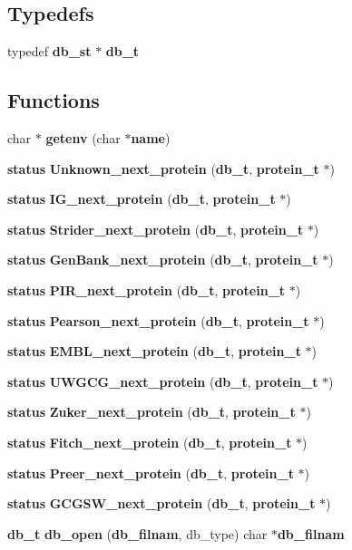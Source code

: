 \subsection*{Typedefs}
\begin{CompactItemize}
\item 
typedef {\bf db\_\-st} $\ast$ {\bf db\_\-t}
\end{CompactItemize}
\subsection*{Functions}
\begin{CompactItemize}
\item 
char $\ast$ {\bf getenv} (char $\ast${\bf name})
\item 
{\bf status} {\bf Unknown\_\-next\_\-protein} ({\bf db\_\-t}, {\bf protein\_\-t} $\ast$)
\item 
{\bf status} {\bf IG\_\-next\_\-protein} ({\bf db\_\-t}, {\bf protein\_\-t} $\ast$)
\item 
{\bf status} {\bf Strider\_\-next\_\-protein} ({\bf db\_\-t}, {\bf protein\_\-t} $\ast$)
\item 
{\bf status} {\bf Gen\-Bank\_\-next\_\-protein} ({\bf db\_\-t}, {\bf protein\_\-t} $\ast$)
\item 
{\bf status} {\bf PIR\_\-next\_\-protein} ({\bf db\_\-t}, {\bf protein\_\-t} $\ast$)
\item 
{\bf status} {\bf Pearson\_\-next\_\-protein} ({\bf db\_\-t}, {\bf protein\_\-t} $\ast$)
\item 
{\bf status} {\bf EMBL\_\-next\_\-protein} ({\bf db\_\-t}, {\bf protein\_\-t} $\ast$)
\item 
{\bf status} {\bf UWGCG\_\-next\_\-protein} ({\bf db\_\-t}, {\bf protein\_\-t} $\ast$)
\item 
{\bf status} {\bf Zuker\_\-next\_\-protein} ({\bf db\_\-t}, {\bf protein\_\-t} $\ast$)
\item 
{\bf status} {\bf Fitch\_\-next\_\-protein} ({\bf db\_\-t}, {\bf protein\_\-t} $\ast$)
\item 
{\bf status} {\bf Preer\_\-next\_\-protein} ({\bf db\_\-t}, {\bf protein\_\-t} $\ast$)
\item 
{\bf status} {\bf GCGSW\_\-next\_\-protein} ({\bf db\_\-t}, {\bf protein\_\-t} $\ast$)
\item 
{\bf db\_\-t} {\bf db\_\-open} ({\bf db\_\-filnam}, db\_\-type) char $\ast${\bf db\_\-filnam}
\end{CompactItemize}
